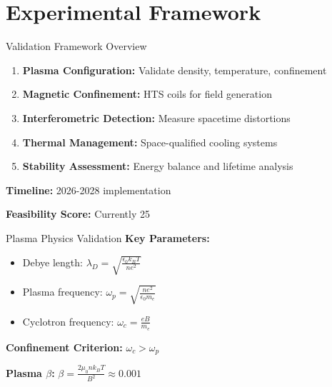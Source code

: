 \section{Experimental Framework}

\begin{frame}{Validation Framework Overview}
    \begin{enumerate}
        \item \textbf{Plasma Configuration:} Validate density, temperature, confinement
        \item \textbf{Magnetic Confinement:} HTS coils for field generation
        \item \textbf{Interferometric Detection:} Measure spacetime distortions
        \item \textbf{Thermal Management:} Space-qualified cooling systems
        \item \textbf{Stability Assessment:} Energy balance and lifetime analysis
    \end{enumerate}
    
    \vspace{0.5cm}
    \textbf{Timeline:} 2026-2028 implementation
    
    \textbf{Feasibility Score:} Currently 25%
\end{frame}

\begin{frame}{Plasma Physics Validation}
    \textbf{Key Parameters:}
    \begin{itemize}
        \item Debye length: $\lambda_D = \sqrt{\frac{\epsilon_0 k_B T}{n e^2}}$
        \item Plasma frequency: $\omega_p = \sqrt{\frac{n e^2}{\epsilon_0 m_e}}$
        \item Cyclotron frequency: $\omega_c = \frac{e B}{m_e}$
    \end{itemize}
    
    \vspace{0.3cm}
    \textbf{Confinement Criterion:} $\omega_c > \omega_p$
    
    \textbf{Plasma $\beta$:} $\beta = \frac{2\mu_0 n k_B T}{B^2} \approx 0.001$
\end{frame}

